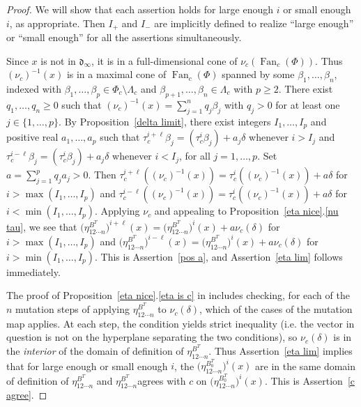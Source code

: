 \documentclass[10pt]{article}
\theoremstyle{definition}
\theoremstyle{remark}
\numberwithin{equation}{section}
\newcommand{\set}[1]{{\lbrace #1 \rbrace}}
\newcommand{\0}{{\mathbf{0}}}
\newcommand{\Fan}{\operatorname{Fan}}
\renewcommand{\d}{{\mathfrak d}}
\newcommand{\RSChar}{\Phi}
\newcommand{\RS}{\RSChar}
\newcommand{\AP}[1]{\RS_{#1}}
\newcommand{\APTChar}{\Lambda}
\newcommand{\APT}[1]{\APTChar_{#1}}
\begin{document}
\begin{proof}
We will show that each assertion holds for large enough $i$ or small enough~$i$, as appropriate.
Then $I_+$ and $I_-$ are implicitly defined to realize ``large enough'' or ``small enough'' for all the assertions simultaneously.

Since $x$ is not in $\d_\infty$, it is in a full-dimensional cone of $\nu_c(\Fan_c(\RS))$.
Thus $(\nu_c)^{-1}(x)$ is in a maximal cone of $\Fan_c(\RS)$ spanned by some $\beta_1,\ldots,\beta_n$, indexed with $\beta_1,\ldots,\beta_p\in\AP{c}\setminus\APT{c}$ and $\beta_{p+1},\ldots,\beta_n\in\APT{c}$ with $p\ge2$.
There exist $q_1,\ldots,q_n\ge0$ such that $(\nu_c)^{-1}(x)=\sum_{j=1}^nq_j\beta_j$ with $q_j>0$ for at least one $j\in\set{1,\ldots,p}$.
By Proposition~\ref{delta limit}, there exist integers $I_1,\ldots,I_p$ and positive real $a_1,\ldots,a_p$ such that $\tau_c^{i+\ell}\beta_j=(\tau_c^i\beta_j)+a_j\delta$ whenever $i>I_j$ and $\tau_c^{i-\ell}\beta_j=(\tau_c^i\beta_j)+a_j\delta$ whenever $i<I_j$, for all $j=1,\ldots,p$.
Set $a=\sum_{j=1}^p q_ja_j>0$.
Then $\tau_c^{i+\ell}((\nu_c)^{-1}(x))=\tau_c^i((\nu_c)^{-1}(x))+a\delta$ for $i>\max(I_1,\ldots,I_p)$ and $\tau_c^{i-\ell}((\nu_c)^{-1}(x))=\tau_c^i((\nu_c)^{-1}(x))+a\delta$ for $i<\min(I_1,\ldots,I_p)$.
Applying $\nu_c$ and appealing to Proposition~\ref{eta nice}.\ref{nu tau}, we see that $\bigl(\eta_{12\cdots n}^{B^T}\bigr)^{i+\ell}(x)=\bigl(\eta_{12\cdots n}^{B^T}\bigr)^i(x)+a\nu_c(\delta)$ for $i>\max(I_1,\ldots,I_p)$ and $\bigl(\eta_{12\cdots n}^{B^T}\bigr)^{i-\ell}(x)=\bigl(\eta_{12\cdots n}^{B^T}\bigr)^i(x)+a\nu_c(\delta)$ for $i>\min(I_1,\ldots,I_p)$.
This is Assertion~\ref{pos a}, and Assertion~\ref{eta lim} follows immediately.

The proof of Proposition~\ref{eta nice}.\ref{eta is c} in \cite[Proposition~7.31]{affscat} includes checking, for each of the $n$ mutation steps of applying $\eta^{B^T}_{12\cdots n}$ to $\nu_c(\delta)$, which of the cases of the mutation map applies.
At each step, the condition yields strict inequality (i.e. the vector in question is not on the hyperplane separating the two conditions), so $\nu_c(\delta)$ is in the \emph{interior} of the domain of definition of $\eta^{B^T}_{12\cdots n}$.
Thus Assertion~\ref{eta lim} implies that for large enough or small enough $i$, the $\bigl(\eta_{12\cdots n}^{B_0^T}\bigr)^i(x)$ are in the same domain of definition of $\eta^{B^T}_{12\cdots n}$ and $\eta^{B^T}_{12\cdots n}$agrees with $c$ on $\bigl(\eta_{12\cdots n}^{B_0^T}\bigr)^i(x)$.
This is Assertion~\ref{c agree}.


\end{proof}
\end{document}
